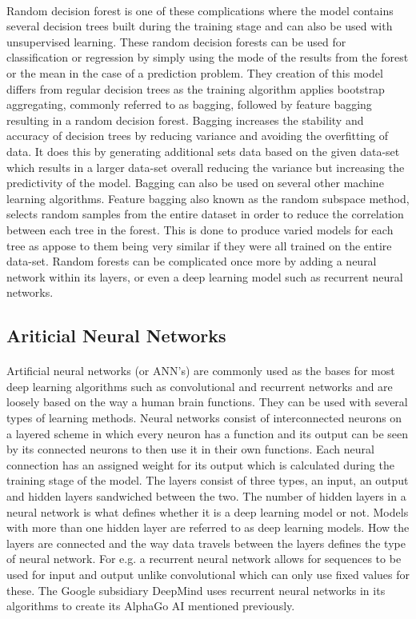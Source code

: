 \paragraph{}Random decision forest is one of these complications where the model contains several decision trees built during the training stage and can also be used with unsupervised learning. These random decision forests can be used for classification or regression by simply using the mode of the results from the forest or the mean in the case of a prediction problem. They creation of this model differs from regular decision trees as the training algorithm applies bootstrap aggregating, commonly referred to as bagging, followed by feature bagging resulting in a random decision forest. Bagging increases the stability and accuracy of decision trees by reducing variance and avoiding the overfitting of data. It does this by generating additional sets data based on the given data-set which results in a larger data-set overall reducing the variance but increasing the predictivity of the model. Bagging can also be used on several other machine learning algorithms. Feature bagging also known as the random subspace method, selects random samples from the entire dataset in order to reduce the correlation between each tree in the forest. This is done to produce varied models for each tree as appose to them being very similar if they were all trained on the entire data-set. Random forests can be complicated once more by adding a neural network within its layers, or even a deep learning model such as recurrent neural networks.
\subsection{Ariticial Neural Networks} 
\paragraph{}Artificial neural networks (or ANN's) are commonly used as the bases for most deep learning algorithms such as convolutional and recurrent networks and are loosely based on the way a human brain functions. They can be used with several types of learning methods. Neural networks consist of interconnected neurons on a layered scheme in which every neuron has a function and its output can be seen by its connected neurons to then use it in their own functions. Each neural connection has an assigned weight for its output which is calculated during the training stage of the model. The layers consist of three types, an input, an output and hidden layers sandwiched between the two. The number of hidden layers in a neural network is what defines whether it is a deep learning model or not. Models with more than one hidden layer are referred to as deep learning models. How the layers are connected and the way data travels between the layers defines the type of neural network. For e.g. a recurrent neural network allows for sequences to be used for input and output unlike convolutional which can only use fixed values for these. The Google subsidiary DeepMind uses recurrent neural networks in its algorithms to create its AlphaGo AI mentioned previously.

